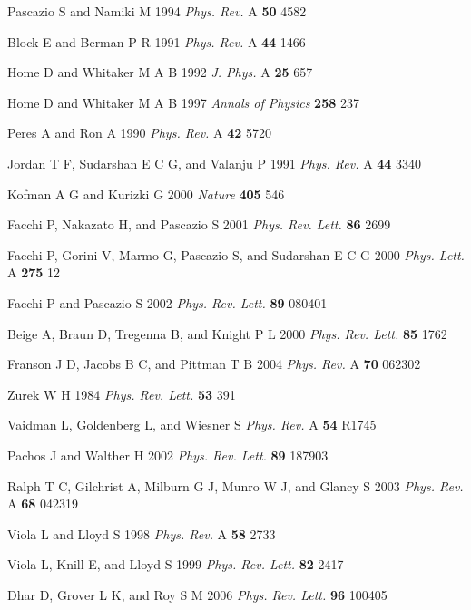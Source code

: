 \documentclass[letterpaper]{jpconf}
\begin{document}
\begin{thebibliography}{99}
Pascazio S and Namiki M 1994 {\it Phys. Rev.} A
{\bf 50} 4582

Block E and Berman P R 1991 {\it Phys. Rev.} A {\bf
44} 1466

Home D and Whitaker M A B 1992 {\it J. Phys.} A {\bf
25} 657

Home D and Whitaker M A B 1997 {\it Annals of
Physics} {\bf 258} 237

Peres A and Ron A 1990 {\it Phys. Rev.} A {\bf 42}
5720

Jordan T F, Sudarshan E C G, and Valanju P 1991 {\it
Phys. Rev.} A {\bf 44} 3340

Kofman A G and Kurizki G 2000 {\it Nature} {\bf
405} 546

Facchi P, Nakazato H, and Pascazio S 2001 {\it Phys.
Rev. Lett.} {\bf 86} 2699

Facchi P, Gorini V, Marmo G, Pascazio S, and
Sudarshan E C G 2000 {\it Phys. Lett.} A {\bf 275} 12

Facchi P and Pascazio S 2002 {\it Phys. Rev.
Lett.} {\bf 89} 080401

Beige A, Braun D, Tregenna B, and Knight P L 2000
{\it Phys. Rev. Lett.} {\bf 85} 1762

Franson J D, Jacobs B C, and Pittman T B 2004
{\it Phys. Rev.} A {\bf 70} 062302

Zurek W H 1984 {\it Phys. Rev. Lett.} {\bf 53} 391

Vaidman L, Goldenberg L, and Wiesner S {\it Phys.
Rev.} A {\bf 54} R1745

Pachos J and Walther H 2002 {\it Phys. Rev. Lett.}
{\bf 89} 187903

Ralph T C, Gilchrist A, Milburn G J, Munro W J, and
Glancy S 2003 {\it Phys. Rev.} A {\bf 68} 042319

Viola L and Lloyd S 1998 {\it Phys. Rev.} A
{\bf 58} 2733

Viola L, Knill E, and Lloyd S 1999 {\it Phys. Rev.
Lett.} {\bf 82} 2417

Dhar D, Grover L K, and Roy S M 2006 {\it Phys. Rev.
Lett.} {\bf 96} 100405



\end{thebibliography}
\end{document}

